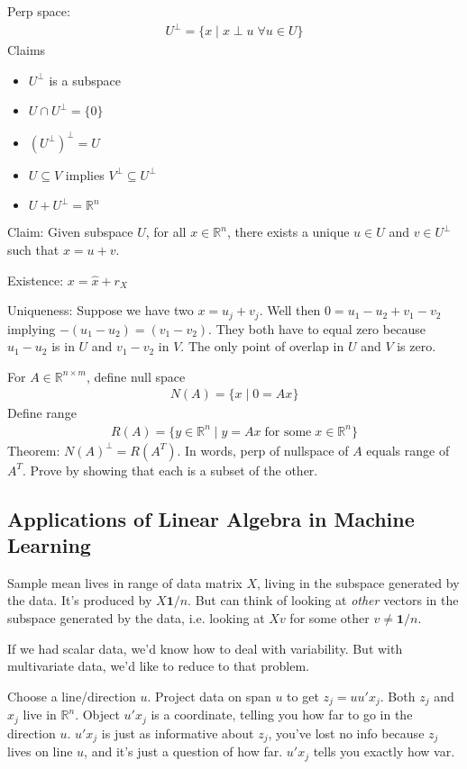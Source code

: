 \documentclass[12pt]{article}
\numberwithin{equation}{section} %
\theoremstyle{plain}
\theoremstyle{definition}
\theoremstyle{remark}
\newcommand{\R}{\mathbb{R}}
\begin{document}
Perp space:
\begin{align*}
  U^\perp
  =
  \{x \;|\; x\perp u\;\forall u\in U\}
\end{align*}
Claims
\begin{itemize}
  \item $U^\perp$ is a subspace
  \item $U\cap U^\perp=\{0\}$
  \item $(U^\perp)^\perp=U$
  \item $U\subseteq V$ implies $V^\perp \subseteq U^\perp$
  \item $U+U^\perp = \R^n$
\end{itemize}
Claim: Given subspace $U$, for all $x\in \R^n$, there exists a unique
$u\in U$ and $v\in U^\perp$ such that $x=u+v$.

Existence: $x=\hat{x}+r_X$

Uniqueness: Suppose we have two $x=u_j + v_j$.
Well then $0=u_1-u_2+v_1-v_2$ implying $-(u_1-u_2)=(v_1-v_2)$.
They both have to equal zero because $u_1-u_2$ is in $U$ and $v_1-v_2$
in $V$. The only point of overlap in $U$ and $V$ is zero.


For $A\in \R^{n\times m}$, define null space
\begin{align*}
  N(A) = \{x\;|\; 0=Ax\}
\end{align*}
Define range
\begin{align*}
  R(A) = \{y\in \R^n\;|\; y=Ax \;\text{for some}\; x\in\R^n\}
\end{align*}
Theorem: $N(A)^{\perp}=R(A^T)$.
In words, perp of nullspace of $A$ equals range of $A^T$.
Prove by showing that each is a subset of the other.


\clearpage
\subsection{Applications of Linear Algebra in Machine Learning}

Sample mean lives in range of data matrix $X$, living in the subspace
generated by the data.
It's produced by $X\mathbf{1}/n$.
But can think of looking at \emph{other} vectors in the subspace
generated by the data, i.e. looking at $Xv$ for some other
$v\neq \mathbf{1}/n$.

If we had scalar data, we'd know how to deal with variability.
But with multivariate data, we'd like to reduce to that problem.

Choose a line/direction $u$.
Project data on span $u$ to get
$z_j=uu'x_j$.
Both $z_j$ and $x_j$ live in $\R^n$.
Object $u'x_j$ is a coordinate, telling you how far to go in the
direction $u$.
$u'x_j$ is just as informative about $z_j$, you've lost no info because
$z_j$ lives on line $u$, and it's just a question of how far. $u'x_j$
tells you exactly how var.
\end{document}
